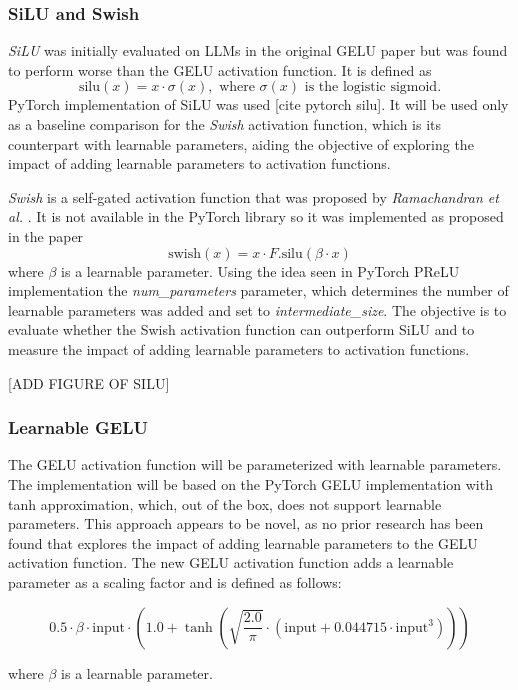 \subsubsection{SiLU and Swish}
\textit{SiLU} was initially evaluated on LLMs in the original GELU paper \cite{Hendrycks2023} but was found to perform worse than the GELU activation function. It is defined as 
\[
\text{silu}(x) = x \cdot \sigma(x), \text{ where } \sigma(x) \text{ is the logistic sigmoid.}
\]
PyTorch implementation of SiLU was used [cite pytorch silu].
It will be used only as a baseline comparison for the \textit{Swish} activation function, which is its counterpart with learnable parameters, aiding the objective of exploring the impact of adding learnable parameters to activation functions. 

\textit{Swish} is a self-gated activation function that was proposed by \textit{Ramachandran et al.} \cite{Ramachandran2017}. It is not available in the PyTorch library so it was implemented as proposed in the paper 
\[
    \text{swish}(x) = x \cdot F.\text{silu}(\beta \cdot x)
\]
where \(\beta\) is a learnable parameter. Using the idea seen in PyTorch PReLU implementation the \textit{num\_parameters} parameter, which determines the number of learnable parameters was added and set to \textit{intermediate\_size}. The objective is to evaluate whether the Swish activation function can outperform SiLU and to measure the impact of adding learnable parameters to activation functions.

[ADD FIGURE OF SILU]

\subsubsection{Learnable GELU}
The GELU activation function will be parameterized with learnable parameters. The implementation will be based on the PyTorch GELU implementation with tanh approximation, which, out of the box, does not support learnable parameters. This approach appears to be novel, as no prior research has been found that explores the impact of adding learnable parameters to the GELU activation function. The new GELU activation function adds a learnable parameter as a scaling factor and is defined as follows:

\[
    0.5 \cdot \beta \cdot \text{input} \cdot \left( 1.0 + \tanh \left( \sqrt{\frac{2.0}{\pi}} \cdot (\text{input} + 0.044715 \cdot \text{input}^3) \right) \right)
\]

where \(\beta\) is a learnable parameter. 

